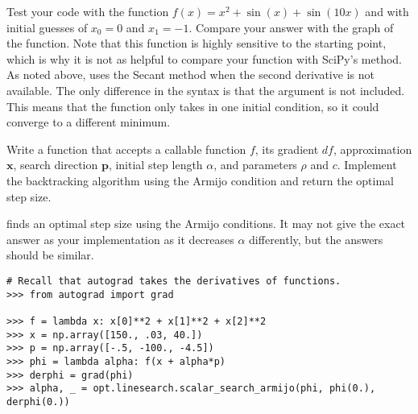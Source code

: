 Test your code with the function $f(x) = x^2 + \sin(x) + \sin(10x)$ and with initial guesses of $x_0 = 0$ and $x_1 = -1$.
Compare your answer with the graph of the function.
Note that this function is highly sensitive to the starting point, which is why it is not as helpful to compare your function with SciPy's method.
As noted above,  uses the Secant method when the second derivative is not available.
The only difference in the syntax is that the  argument is not included.
This means that the function only takes in one initial condition, so it could converge to a different minimum.

Write a function that accepts a callable function $f$, its gradient $df$, approximation $\textbf{x}$, search direction $\textbf{p}$, initial step length $\alpha$, and parameters $\rho$ and $c$.
Implement the backtracking algorithm using the Armijo condition and return the optimal step size.

 finds an optimal step size using the Armijo conditions.
It may not give the exact answer as your implementation as it decreases $\alpha$ differently, but the answers should be similar.
\begin{lstlisting}
# Recall that autograd takes the derivatives of functions.
>>> from autograd import grad

>>> f = lambda x: x[0]**2 + x[1]**2 + x[2]**2
>>> x = np.array([150., .03, 40.])
>>> p = np.array([-.5, -100., -4.5])
>>> phi = lambda alpha: f(x + alpha*p)
>>> derphi = grad(phi)
>>> alpha, _ = opt.linesearch.scalar_search_armijo(phi, phi(0.), derphi(0.))

\end{lstlisting}
